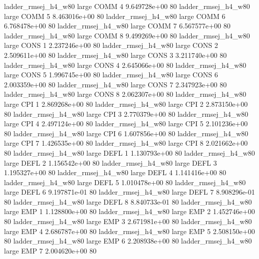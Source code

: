 ladder_rmsej_h4_w80      large     COMM                 4 9.649728e+00 80
ladder_rmsej_h4_w80      large     COMM                 5 8.463016e+00 80
ladder_rmsej_h4_w80      large     COMM                 6 6.768478e+00 80
ladder_rmsej_h4_w80      large     COMM                 7 6.567577e+00 80
ladder_rmsej_h4_w80      large     COMM                 8 9.499269e+00 80
ladder_rmsej_h4_w80      large     CONS                 1 2.237246e+00 80
ladder_rmsej_h4_w80      large     CONS                 2 2.509611e+00 80
ladder_rmsej_h4_w80      large     CONS                 3 3.211740e+00 80
ladder_rmsej_h4_w80      large     CONS                 4 2.645066e+00 80
ladder_rmsej_h4_w80      large     CONS                 5 1.996745e+00 80
ladder_rmsej_h4_w80      large     CONS                 6 2.003359e+00 80
ladder_rmsej_h4_w80      large     CONS                 7 2.347923e+00 80
ladder_rmsej_h4_w80      large     CONS                 8 2.062307e+00 80
ladder_rmsej_h4_w80      large      CPI                 1 2.869268e+00 80
ladder_rmsej_h4_w80      large      CPI                 2 2.873150e+00 80
ladder_rmsej_h4_w80      large      CPI                 3 2.770379e+00 80
ladder_rmsej_h4_w80      large      CPI                 4 2.497124e+00 80
ladder_rmsej_h4_w80      large      CPI                 5 2.101236e+00 80
ladder_rmsej_h4_w80      large      CPI                 6 1.607856e+00 80
ladder_rmsej_h4_w80      large      CPI                 7 1.426535e+00 80
ladder_rmsej_h4_w80      large      CPI                 8 2.021662e+00 80
ladder_rmsej_h4_w80      large     DEFL                 1 1.130793e+00 80
ladder_rmsej_h4_w80      large     DEFL                 2 1.156542e+00 80
ladder_rmsej_h4_w80      large     DEFL                 3 1.195327e+00 80
ladder_rmsej_h4_w80      large     DEFL                 4 1.141416e+00 80
ladder_rmsej_h4_w80      large     DEFL                 5 1.010478e+00 80
ladder_rmsej_h4_w80      large     DEFL                 6 9.197871e-01 80
ladder_rmsej_h4_w80      large     DEFL                 7 8.908296e-01 80
ladder_rmsej_h4_w80      large     DEFL                 8 8.840733e-01 80
ladder_rmsej_h4_w80      large      EMP                 1 1.128800e+00 80
ladder_rmsej_h4_w80      large      EMP                 2 1.452746e+00 80
ladder_rmsej_h4_w80      large      EMP                 3 2.671981e+00 80
ladder_rmsej_h4_w80      large      EMP                 4 2.686787e+00 80
ladder_rmsej_h4_w80      large      EMP                 5 2.508150e+00 80
ladder_rmsej_h4_w80      large      EMP                 6 2.208938e+00 80
ladder_rmsej_h4_w80      large      EMP                 7 2.004620e+00 80
